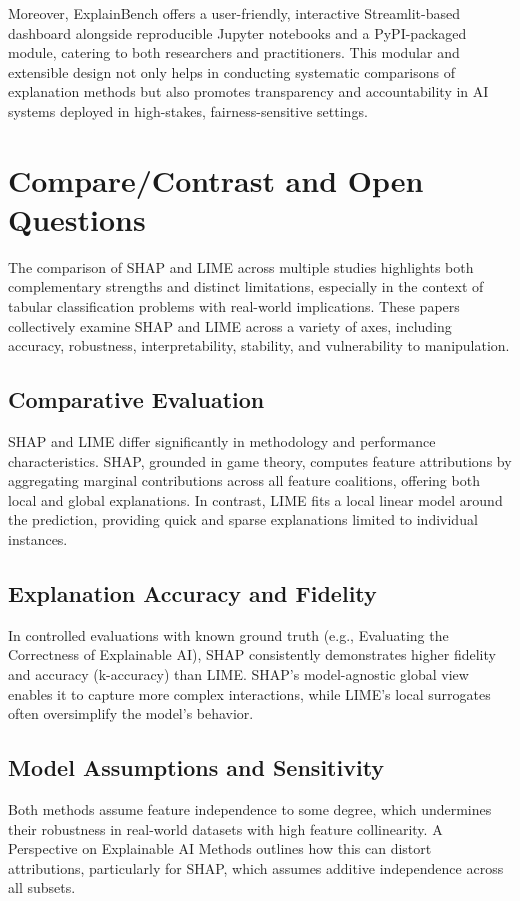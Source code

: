 \documentclass{article}
\begin{document}
Moreover, ExplainBench offers a user-friendly, interactive Streamlit-based dashboard alongside reproducible Jupyter notebooks and a PyPI-packaged module, catering to both researchers and practitioners. This modular and extensible design not only helps in conducting systematic comparisons of explanation methods but also promotes transparency and accountability in AI systems deployed in high-stakes, fairness-sensitive settings.

\section{Compare/Contrast and Open Questions}
The comparison of SHAP and LIME across multiple studies highlights both complementary strengths and distinct limitations, especially in the context of tabular classification problems with real-world implications. These papers collectively examine SHAP and LIME across a variety of axes, including accuracy, robustness, interpretability, stability, and vulnerability to manipulation.

\subsection{Comparative Evaluation}
SHAP and LIME differ significantly in methodology and performance characteristics. SHAP, grounded in game theory, computes feature attributions by aggregating marginal contributions across all feature coalitions, offering both local and global explanations. In contrast, LIME fits a local linear model around the prediction, providing quick and sparse explanations limited to individual instances.

\subsection{Explanation Accuracy and Fidelity}
In controlled evaluations with known ground truth (e.g., Evaluating the Correctness of Explainable AI), SHAP consistently demonstrates higher fidelity and accuracy (k-accuracy) than LIME. SHAP's model-agnostic global view enables it to capture more complex interactions, while LIME’s local surrogates often oversimplify the model’s behavior.

\subsection{Model Assumptions and Sensitivity}
Both methods assume feature independence to some degree, which undermines their robustness in real-world datasets with high feature collinearity. A Perspective on Explainable AI Methods outlines how this can distort attributions, particularly for SHAP, which assumes additive independence across all subsets.
\end{document}
